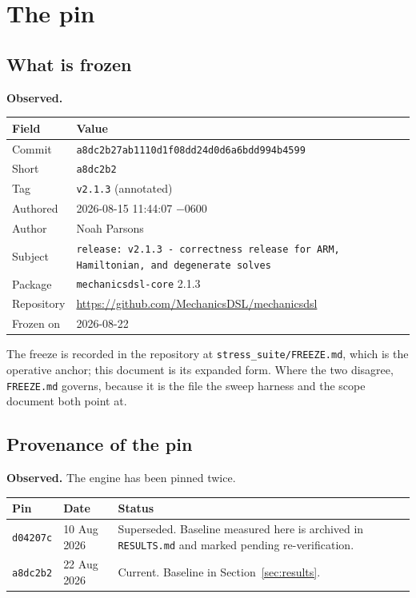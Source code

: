 \documentclass[11pt,a4paper]{article}
\newcommand{\gitsha}[1]{\texttt{#1}}
\begin{document}
\section{The pin}\label{sec:pin}

\subsection{What is frozen}

\noindent\textbf{Observed.}

\begin{center}
\begin{tabular}{@{}lL{0.63\textwidth}@{}}
\toprule
\textbf{Field} & \textbf{Value} \\
\midrule
Commit      & \gitsha{a8dc2b27ab1110d1f08dd24d0d6a6bdd994b4599} \\
Short       & \gitsha{a8dc2b2} \\
Tag         & \texttt{v2.1.3} (annotated) \\
Authored    & 2026-08-15 11:44:07 $-$0600 \\
Author      & Noah Parsons \\
Subject     & \texttt{release: v2.1.3 - correctness release for ARM, Hamiltonian, and degenerate solves} \\
Package     & \texttt{mechanicsdsl-core} 2.1.3 \\
Repository  & \url{https://github.com/MechanicsDSL/mechanicsdsl} \\
Frozen on   & 2026-08-22 \\
\bottomrule
\end{tabular}
\end{center}

The freeze is recorded in the repository at \texttt{stress\_suite/FREEZE.md},
which is the operative anchor; this document is its expanded form. Where the
two disagree, \texttt{FREEZE.md} governs, because it is the file the sweep
harness and the scope document both point at.

\subsection{Provenance of the pin}

\noindent\textbf{Observed.} The engine has been pinned twice.

\begin{center}
\begin{tabular}{@{}llL{0.44\textwidth}@{}}
\toprule
\textbf{Pin} & \textbf{Date} & \textbf{Status} \\
\midrule
\gitsha{d04207c} & 10 Aug 2026 & Superseded. Baseline measured here is
                                 archived in \texttt{RESULTS.md} and marked
                                 pending re-verification. \\
\gitsha{a8dc2b2} & 22 Aug 2026 & Current. Baseline in
                                 Section~\ref{sec:results}. \\
\bottomrule
\end{tabular}
\end{center}
\end{document}
